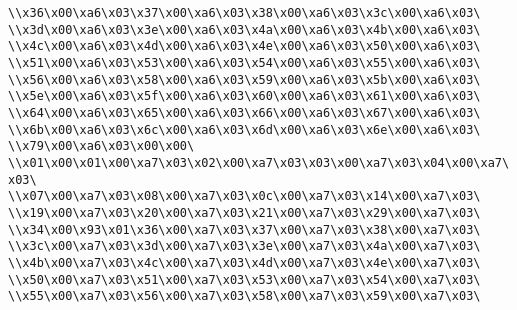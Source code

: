 \verb|\\x36\x00\xa6\x03\x37\x00\xa6\x03\x38\x00\xa6\x03\x3c\x00\xa6\x03\|\newline
\verb|\\x3d\x00\xa6\x03\x3e\x00\xa6\x03\x4a\x00\xa6\x03\x4b\x00\xa6\x03\|\newline
\verb|\\x4c\x00\xa6\x03\x4d\x00\xa6\x03\x4e\x00\xa6\x03\x50\x00\xa6\x03\|\newline
\verb|\\x51\x00\xa6\x03\x53\x00\xa6\x03\x54\x00\xa6\x03\x55\x00\xa6\x03\|\newline
\verb|\\x56\x00\xa6\x03\x58\x00\xa6\x03\x59\x00\xa6\x03\x5b\x00\xa6\x03\|\newline
\verb|\\x5e\x00\xa6\x03\x5f\x00\xa6\x03\x60\x00\xa6\x03\x61\x00\xa6\x03\|\newline
\verb|\\x64\x00\xa6\x03\x65\x00\xa6\x03\x66\x00\xa6\x03\x67\x00\xa6\x03\|\newline
\verb|\\x6b\x00\xa6\x03\x6c\x00\xa6\x03\x6d\x00\xa6\x03\x6e\x00\xa6\x03\|\newline
\verb|\\x79\x00\xa6\x03\x00\x00\|\newline
\verb|\\x01\x00\x01\x00\xa7\x03\x02\x00\xa7\x03\x03\x00\xa7\x03\x04\x00\xa7\x03\|\newline
\verb|\\x07\x00\xa7\x03\x08\x00\xa7\x03\x0c\x00\xa7\x03\x14\x00\xa7\x03\|\newline
\verb|\\x19\x00\xa7\x03\x20\x00\xa7\x03\x21\x00\xa7\x03\x29\x00\xa7\x03\|\newline
\verb|\\x34\x00\x93\x01\x36\x00\xa7\x03\x37\x00\xa7\x03\x38\x00\xa7\x03\|\newline
\verb|\\x3c\x00\xa7\x03\x3d\x00\xa7\x03\x3e\x00\xa7\x03\x4a\x00\xa7\x03\|\newline
\verb|\\x4b\x00\xa7\x03\x4c\x00\xa7\x03\x4d\x00\xa7\x03\x4e\x00\xa7\x03\|\newline
\verb|\\x50\x00\xa7\x03\x51\x00\xa7\x03\x53\x00\xa7\x03\x54\x00\xa7\x03\|\newline
\verb|\\x55\x00\xa7\x03\x56\x00\xa7\x03\x58\x00\xa7\x03\x59\x00\xa7\x03\|\newline
